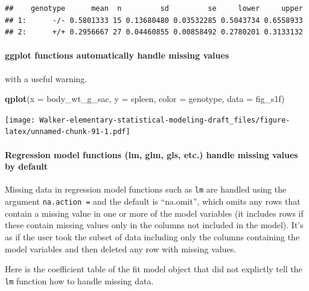 \documentclass[]{book}
\newenvironment{Shaded}{\begin{snugshade}}{\end{snugshade}}
\newcommand{\DataTypeTok}[1]{\textcolor[rgb]{0.13,0.29,0.53}{#1}}
\newcommand{\KeywordTok}[1]{\textcolor[rgb]{0.13,0.29,0.53}{\textbf{#1}}}
\newcommand{\NormalTok}[1]{#1}
\let\oldparagraph\paragraph
\renewcommand{\paragraph}[1]{\oldparagraph{#1}\mbox{}}
\begin{document}
\begin{verbatim}
##    genotype      mean  n         sd         se     lower     upper
## 1:      -/- 0.5801333 15 0.13680480 0.03532285 0.5043734 0.6558933
## 2:      +/+ 0.2956667 27 0.04460855 0.00858492 0.2780201 0.3133132
\end{verbatim}

\hypertarget{ggplot-functions-automatically-handle-missing-values}{%
\paragraph{ggplot functions automatically handle missing values}\label{ggplot-functions-automatically-handle-missing-values}}

with a useful warning.

\begin{Shaded}
\begin{Highlighting}[]
\KeywordTok{qplot}\NormalTok{(}\DataTypeTok{x =}\NormalTok{ body_wt_g_sac,}
      \DataTypeTok{y =}\NormalTok{ spleen,}
      \DataTypeTok{color =}\NormalTok{ genotype,}
      \DataTypeTok{data =}\NormalTok{ fig_s1f)}
\end{Highlighting}
\end{Shaded}

\texttt{[image: Walker-elementary-statistical-modeling-draft\_files/figure-latex/unnamed-chunk-91-1.pdf]}

\hypertarget{regression-model-functions-lm-glm-gls-etc.-handle-missing-values-by-default}{%
\paragraph{Regression model functions (lm, glm, gls, etc.) handle missing values by default}\label{regression-model-functions-lm-glm-gls-etc.-handle-missing-values-by-default}}

Missing data in regression model functions such as \texttt{lm} are handled using the argument \texttt{na.action\ =} and the default is ``na.omit'', which omits any rows that contain a missing value in one or more of the model variables (it includes rows if these contain missing values only in the columns not included in the model). It's as if the user took the subset of data including only the columns containing the model variables and then deleted any row with missing values.

Here is the coefficient table of the fit model object that did not explictly tell the \texttt{lm} function how to handle missing data.
\end{document}
